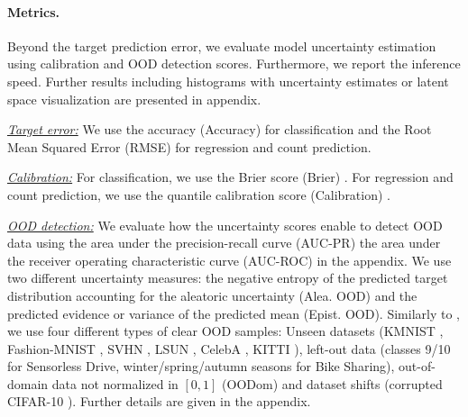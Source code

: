 \paragraph{Metrics.} Beyond the target prediction error, we evaluate model uncertainty estimation using calibration and OOD detection scores. Furthermore, we report the inference speed. Further results including histograms with uncertainty estimates or latent space visualization are presented in appendix. 

\textit{\underline{Target error:}} We use the accuracy (Accuracy) for classification and the Root Mean Squared Error (RMSE) for regression and count prediction. 

\textit{\underline{Calibration:}} For classification, we use the Brier score (Brier) \citep{scoring-rules}. For regression and count prediction, we use the quantile calibration score (Calibration) \citep{accurate-uncertainties-deep-learning-regression}. 

\textit{\underline{OOD detection:}} We evaluate how the uncertainty scores enable to detect OOD data using the area under the precision-recall curve (AUC-PR) the area under the receiver operating characteristic curve (AUC-ROC) in the appendix. We use two different uncertainty measures: the negative entropy of the predicted target distribution accounting for the aleatoric uncertainty (Alea. OOD) and the predicted evidence or variance of the predicted mean (Epist. OOD). Similarly to \citep{dataset-shift, postnet}, we use four different types of clear OOD samples: Unseen datasets (KMNIST \cite{kmnist}, Fashion-MNIST \citep{fashion-mnist}, SVHN \citep{svhn}, LSUN \citep{lsun}, CelebA \citep{celeba}, KITTI \citep{kitti}), left-out data (classes 9/10 for Sensorless Drive, winter/spring/autumn seasons for Bike Sharing), out-of-domain data not normalized in $[0, 1]$ (OODom) and dataset shifts (corrupted CIFAR-10 \citep{benchmarking-corruptions}). Further details are given in the appendix.

